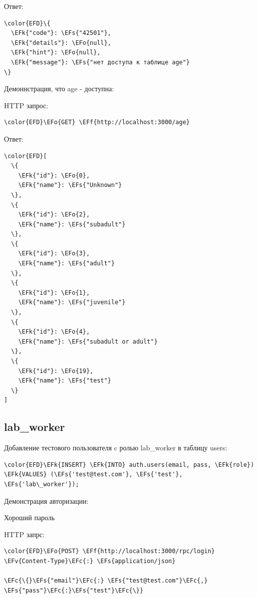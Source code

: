 \documentclass[14pt]{extarticle}
\newcommand{\EFc}[1]{\textcolor{EFc}{#1}} %
\newcommand{\EFs}[1]{\textcolor{EFs}{#1}} %
\newcommand{\EFk}[1]{\textcolor{EFk}{#1}} %
\newcommand{\EFf}[1]{\textcolor{EFf}{#1}} %
\newcommand{\EFv}[1]{\textcolor{EFv}{#1}} %
\newcommand{\EFo}[1]{\textcolor{EFo}{#1}} %
\begin{document}
Ответ:
\begin{Code}
\begin{Verbatim}
\color{EFD}\{
  \EFk{"code"}: \EFs{"42501"},
  \EFk{"details"}: \EFo{null},
  \EFk{"hint"}: \EFo{null},
  \EFk{"message"}: \EFs{"нет доступа к таблице age"}
\}
\end{Verbatim}
\end{Code}


Демоннстрация, что age - доступна:

HTTP запрос:
\begin{Code}
\begin{Verbatim}
\color{EFD}\EFo{GET} \EFf{http://localhost:3000/age}
\end{Verbatim}
\end{Code}


Ответ:
\begin{Code}
\begin{Verbatim}
\color{EFD}[
  \{
    \EFk{"id"}: \EFo{0},
    \EFk{"name"}: \EFs{"Unknown"}
  \},
  \{
    \EFk{"id"}: \EFo{2},
    \EFk{"name"}: \EFs{"subadult"}
  \},
  \{
    \EFk{"id"}: \EFo{3},
    \EFk{"name"}: \EFs{"adult"}
  \},
  \{
    \EFk{"id"}: \EFo{1},
    \EFk{"name"}: \EFs{"juvenile"}
  \},
  \{
    \EFk{"id"}: \EFo{4},
    \EFk{"name"}: \EFs{"subadult or adult"}
  \},
  \{
    \EFk{"id"}: \EFo{19},
    \EFk{"name"}: \EFs{"test"}
  \}
]
\end{Verbatim}
\end{Code}


\subsection{lab\_​worker}
\label{sec:org0885b0a}

Добавление тестового пользователя c ролью lab\_​worker в таблицу users:
\begin{Code}
\begin{Verbatim}
\color{EFD}\EFk{INSERT} \EFk{INTO} auth.users(email, pass, \EFk{role}) \EFk{VALUES} (\EFs{'test@test.com'}, \EFs{'test'}, \EFs{'lab\_worker'});
\end{Verbatim}
\end{Code}


Демонстрация авторизации:


Хороший пароль

HTTP запрс:
\begin{Code}
\begin{Verbatim}
\color{EFD}\EFo{POST} \EFf{http://localhost:3000/rpc/login}
\EFv{Content-Type}\EFc{:} \EFs{application/json}

\EFc{\{}\EFs{"email"}\EFc{:} \EFs{"test@test.com"}\EFc{,} \EFs{"pass"}\EFc{:}\EFs{"test"}\EFc{\}}
\end{Verbatim}
\end{Code}
\end{document}
